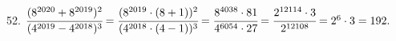 52. $\cfrac{(8^{2020}+8^{2019})^2}{(4^{2019}-4^{2018})^3}=\cfrac{(8^{2019}\cdot(8+1))^2}{(4^{2018}\cdot(4-1))^3}=
\cfrac{8^{4038}\cdot81}{4^{6054}\cdot27}=\cfrac{2^{12114}\cdot3}{2^{12108}}=2^6\cdot3=192.$\\
